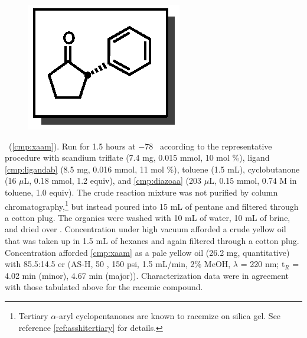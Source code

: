 \pagebreak
\begin{figure}
  \vspace{-15pt}
  \begin{center}
    \includegraphics[scale=0.8]{chp_asymmetric/images/xaam}
  \end{center}
  \vspace{-25pt}
\end{figure}\noindent \textbf{\CMPxaam}\ (\ref{cmp:xaam}). Run for 1.5 hours
at $-$78 \degc\  according to the representative procedure with scandium
triflate (7.4 mg, 0.015 mmol, 10 mol \%), ligand \ref{cmp:ligandab} (8.5 mg, 0.016 mmol,
11 mol \%), toluene (1.5 mL), cyclobutanone (16 $\mu$L, 0.18 mmol, 1.2 equiv),
and \ref{cmp:diazoaa} (203 $\mu$L, 0.15 mmol, 0.74 M in toluene, 1.0 equiv). The
crude reaction mixture was not purified by column
chromatography,\footnote{Tertiary $\alpha$-aryl
cyclopentanones are known to racemize on silica gel. See
reference \ref{ref:asshitertiary} for details.} but instead poured into 15 mL of
pentane and filtered through a cotton plug. The organics were washed with 10 mL of water, 10 mL of brine, and dried over .
Concentration under high vacuum afforded a crude yellow oil that was taken up in
1.5 mL of hexanes and again filtered through a cotton plug. Concentration
afforded \ref{cmp:xaam} as a pale yellow oil (26.2 mg, quantitative) with
85.5:14.5 er (AS-H, 50 \degc, 150 psi, 1.5 mL/min, 2\% MeOH, $\lambda$ = 220 nm;
t$_R$ = 4.02 min (minor), 4.67 min (major)). Characterization data were in agreement with those tabulated above for the racemic compound. \\
